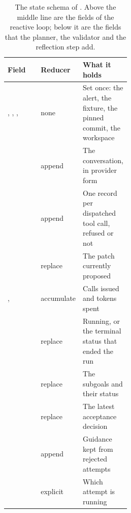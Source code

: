 \begin{table}[htbp]
  \caption{The state schema of \msa{}. Above the middle line are the fields of the reactive loop;
  below it are the fields that the planner, the validator and the reflection step add.}
  \label{tab:state-schema}
  \begin{adjustbox}{width=\linewidth}\begin{tabularx}{\linewidth}{@{}L{0.29\linewidth}L{0.19\linewidth}X@{}}
    \toprule
    \textbf{Field} & \textbf{Reducer} & \textbf{What it holds} \\
    \midrule
    , , ,  & none & Set once: the
      alert, the fixture, the pinned commit, the workspace \\
     & append & The conversation, in provider form \\
     & append & One record per dispatched tool call, refused or not \\
     & replace & The patch currently proposed \\
    ,  & accumulate & Calls issued and tokens spent \\
     & replace & Running, or the terminal status that ended the run \\
    \midrule
     & replace & The subgoals and their status \\
     & replace & The latest acceptance decision \\
     & append & Guidance kept from rejected attempts \\
     & explicit & Which attempt is running \\
    \bottomrule
  \end{tabularx}\end{adjustbox}
\end{table}

